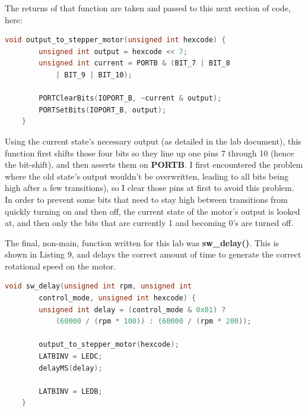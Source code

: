 \documentclass[a4paper, 12pt]{article}
\begin{document}
The returns of that function are taken and passed to this next section of code, here:

	\begin{mdframed}[backgroundcolor=code-gray, roundcorner=10pt,
								innerleftmargin=5, innertopmargin=5, innerbottommargin=5]	
	\begin{lstlisting}[language=C, caption=Applying Output to the Motor's Pins, tabsize=2]
	void output_to_stepper_motor(unsigned int hexcode) {
		unsigned int output = hexcode << 7;
		unsigned int current = PORTB & (BIT_7 | BIT_8
			| BIT_9 | BIT_10);

		PORTClearBits(IOPORT_B, ~current & output);
		PORTSetBits(IOPORT_B, output);
	}
	\end{lstlisting}
	\end{mdframed}
	
Using the current state's necessary output (as detailed in the lab document), this function first shifts those four bits so they line up one pins 7 through 10 (hence the bit-shift), and then asserts them on \textbf{PORTB}. I first encountered the problem where the old state's output wouldn't be overwritten, leading to all bits being high after a few transitions), so I clear those pins at first to avoid this problem. In order to prevent some bits that need to stay high between transitions from quickly turning on and then off, the current state of the motor's output is looked at, and then only the bits that are currently 1 and becoming 0's are turned off.

The final, non-main, function written for this lab was \textbf{sw\_delay()}. This is shown in Listing 9, and delays the correct amount of time to generate the correct rotational speed on the motor.

	\begin{mdframed}[backgroundcolor=code-gray, roundcorner=10pt,
								innerleftmargin=5, innertopmargin=5, innerbottommargin=5]	
	\begin{lstlisting}[language=C, caption=Motor Delay Code, tabsize=2]
	void sw_delay(unsigned int rpm, unsigned int
		control_mode, unsigned int hexcode) {
		unsigned int delay = (control_mode & 0x01) ?
			(60000 / (rpm * 100)) : (60000 / (rpm * 200));

		output_to_stepper_motor(hexcode);
		LATBINV = LEDC;
		delayMS(delay);

		LATBINV = LEDB;
	}
	\end{lstlisting}
	\end{mdframed}
	
\end{document}
